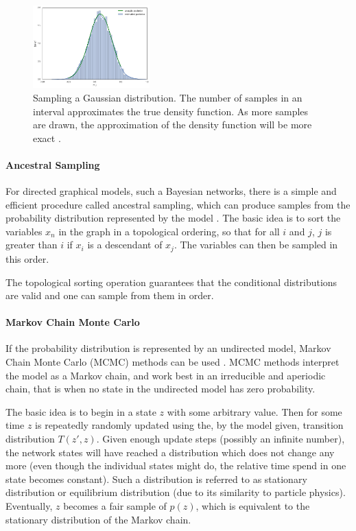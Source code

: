 \begin{figure}
	\centering
    	\includegraphics[width=0.4\textwidth]{imgs/sampling.png} 
    \caption[Sampling a Gaussian distribution.]{Sampling a Gaussian distribution. The number of samples in an interval approximates the true density function. As more samples are drawn, the approximation of the density function will be more exact \cite{sampleFD}.}
	\label{fig:Sampling}
\end{figure}



\paragraph{Ancestral Sampling} For directed graphical models, such a Bayesian networks, there is a simple and efficient procedure called ancestral sampling, which can produce samples from the probability distribution represented by the model \cite{Goodfellow-et-al-2016-Book}. 
The basic idea is to sort the variables $x_n$ in the graph in a topological ordering, so that for all $i$ and $j$, $j$ is greater than $i$ if $x_i$ is a descendant of $x_j$. The variables can then be sampled in this order.

The topological sorting operation guarantees that the conditional distributions are valid and one can sample from them in order.

\paragraph{Markov Chain Monte Carlo} If the probability distribution is represented by an undirected model, Markov Chain Monte Carlo (MCMC) methods can be used \cite{Goodfellow-et-al-2016-Book}. 
MCMC methods interpret the model as a Markov chain, and work best in an irreducible and aperiodic chain, that is when no state in the undirected model has zero probability.

The basic idea is to begin in a state $z$ with some arbitrary value. 
Then for some time $z$ is repeatedly randomly updated using the, by the model given, transition distribution $T(z',z)$. 
Given enough update steps (possibly an infinite number), the network states will have reached a distribution which does not change any more (even though the individual states might do, the relative time spend in one state becomes constant).
Such a distribution is referred to as stationary distribution or equilibrium distribution (due to its similarity to particle physics).
Eventually, $z$ becomes a fair sample of $p(z)$, which is equivalent to the stationary distribution of the Markov chain.

